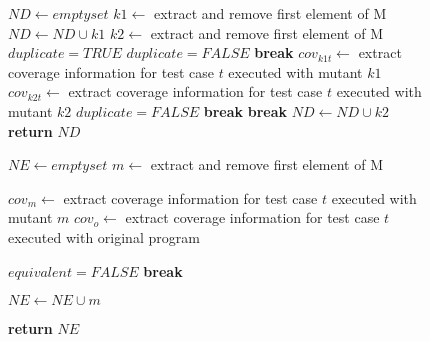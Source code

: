 \begin{figure}[tb]
\begin{algorithmic}[1]
\State $\mathit{ND} \gets \mathit{empty} \mathit{set}$
\State $\mathit{k1} \gets $ extract and remove first element of M
\State $\mathit{ND} \gets \mathit{ND} \cup \mathit{k1}$
\State $\mathit{k2} \gets $ extract and remove first element of M
\State $\mathit{duplicate}=\mathit{TRUE}$
\State $\mathit{duplicate}=\mathit{FALSE}$
\State \textbf{break}
\Else
\State $\mathit{cov}_{k1t} \gets $ extract coverage information for test case $t$ executed with mutant $k1$
\State $\mathit{cov}_{\mathit{k2}t} \gets $ extract coverage information for test case $t$ executed with mutant $k2$
\State $\mathit{duplicate}=\mathit{FALSE}$
\State \textbf{break}
\EndIf
\EndIf
\EndFor
{}
\State \textbf{break} 
\EndIf
\EndFor
{}
\State $\mathit{ND} \gets \mathit{ND} \cup \mathit{k2}$
\EndIf
\EndWhile
\State \textbf{return} $\mathit{ND}$
\EndProcedure


\State $\mathit{NE} \gets \mathit{empty} \mathit{set}$
\State $\mathit{m} \gets $ extract and remove first element of M

\State $\mathit{cov}_{m} \gets $ extract coverage information for test case $t$ executed with mutant $m$
\State $\mathit{cov}_{o} \gets $ extract coverage information for test case $t$ executed with original program

\State $\mathit{equivalent}=\mathit{FALSE}$
\State \textbf{break}
\EndIf

\EndFor

\State $\mathit{NE} \gets \mathit{NE} \cup \mathit{m}$
\EndIf

\EndWhile

\State \textbf{return} $\mathit{NE}$
\EndProcedure




\end{algorithmic}
\end{figure}

